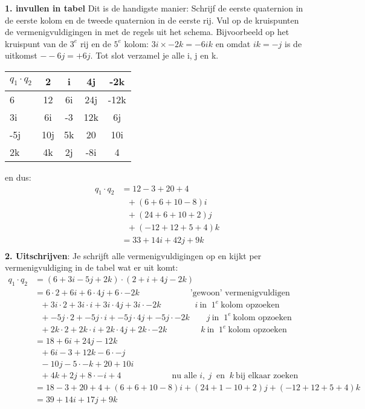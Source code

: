 \textbf{1. invullen in tabel} Dit is de handigste manier:  Schrijf de eerste quaternion in de eerste kolom en de tweede quaternion in de eerste rij. Vul op de kruispunten de 
vermenigvuldigingen in met de  regels uit het schema. Bijvoorbeeld op het kruispunt van de $ 3^e $ rij en de $   5^e $ kolom: $  3i\times -2k = -6ik   $ en omdat $ ik = -j $ is de uitkomst $ --6j = +6j $. Tot slot verzamel je  alle i, j en k.
\begin{center}
	\begin{tabular}{ | l || c | c |c |c |}
		\hline
		$ q_1\cdot q_2 $& 2 & i & 4j & -2k \\ \hline \hline
		6 & 12 & 6i & 24j & -12k  \\ \hline
		3i & 6i & -3 & 12k & 6j\\ \hline
		-5j & 10j &  5k & 20 & 10i\\ \hline
		2k & 4k & 2j & -8i & 4\\ 
		\hline 
	\end{tabular}
\end{center}
en dus:
\begin{align*}
q_1\cdot q_2 & = 12 - 3 + 20 + 4 \\
& \ \ \ +(6 + 6 + 10 - 8)i \\
& \ \ \ +(24 + 6 +10 +2)j \\
& \ \ \ +(-12 + 12 + 5 +4 )k \\
& = 33 +14i +42j +9k \\
\end{align*}
\textbf{2. Uitschrijven}: Je schrijft alle vermenigvuldigingen op en kijkt per vermenigvuldiging in de tabel wat er uit komt:
\begin{align*}
q_1\cdot q_2 & = (6 + 3i - 5j + 2k) \cdot  (2 + i + 4j - 2k) \\
& =   6\cdot 2 + 6i + 6\cdot 4j + 6\cdot -2k \qquad  \qquad \qquad  \text{'gewoon'  vermenigvuldigen}\\
& \ \ \ + 3i\cdot 2 + 3i\cdot i + 3i\cdot 4j + 3i\cdot -2k \qquad \qquad  i\  \text{in } \ 1^e \  \text{kolom opzoeken}\\
& \ \ \ + -5j\cdot 2 + -5j\cdot i + -5j\cdot 4j + -5j\cdot -2k \qquad j \  \text{in }\ 1^e \ \text{kolom opzoeken}\\
& \ \ \ + 2k\cdot 2 + 2k\cdot i + 2k\cdot 4j + 2k\cdot -2k \qquad \qquad k \  \text{in }\ 1^e \ \text{kolom opzoeken}\\
& = 18 + 6i + 24j - 12k \\
& \ \ \ + 6i - 3 + 12k -6\cdot -j \\
& \ \ \ -10j - 5\cdot -k + 20 +10i \\
& \ \ \  + 4k + 2j + 8\cdot -i + 4 \qquad \qquad \qquad   \text{nu alle } i, \ j \ \text{ en } \ k\ \text{bij elkaar  zoeken}\\
& = 18 - 3 + 20 + 4 + (6+6 + 10 -8)i + (24 + 1 - 10 + 2)j + (-12 + 12 + 5 + 4)k \\
&  = 39 + 14i +17j +9k
\end{align*}
